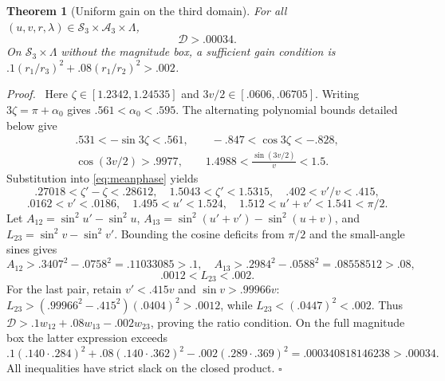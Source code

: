 \documentclass[11pt,a4paper]{article}
\numberwithin{equation}{section}
\newtheorem{theorem}{Theorem}[section]
\newenvironment{proof}[1][Proof]{\par\noindent\textit{#1.}\ \ignorespaces}
{\unskip\nobreak\hfill$\square$\par}
\begin{document}
\begin{theorem}[Uniform gain on the third domain]\label{thm:gain}
For all $(u,v,r,\lambda)\in\mathcal S_3\times\mathcal A_3\times\Lambda$,
\begin{equation}\label{eq:gainmargin}
\mathcal D>.00034.
\end{equation}
On $\mathcal S_3\times\Lambda$ without the magnitude box, a sufficient
gain condition is
$ .1(r_1/r_3)^2+.08(r_1/r_2)^2>.002$.
\end{theorem}
\begin{proof}
Here $\zeta\in[1.2342,1.24535]$ and $3v/2\in[.0606,.06705]$.
Writing $3\zeta=\pi+\alpha_0$ gives $.561<\alpha_0<.595$.
The alternating polynomial bounds detailed below give
\[
\begin{gathered}
.531<-\sin3\zeta<.561,\qquad -.847<\cos3\zeta<-.828,\\
\cos(3v/2)>.9977,\qquad
1.4988<\frac{\sin(3v/2)}v<1.5.
\end{gathered}
\]
Substitution into \eqref{eq:meanphase} yields
\[
.27018<\zeta'-\zeta<.28612,\quad
1.5043<\zeta'<1.5315,\quad .402<v'/v<.415,
\]
\[
.0162<v'<.0186,\quad 1.495<u'<1.524,\quad
1.512<u'+v'<1.541<\pi/2.
\]
Let $A_{12}=\sin^2u'-\sin^2u$, $A_{13}=\sin^2(u'+v')-\sin^2(u+v)$,
and $L_{23}=\sin^2v-\sin^2v'$. Bounding the cosine deficits from $\pi/2$
and the small-angle sines gives
\[
A_{12}>.3407^2-.0758^2=.11033085>.1,\quad
A_{13}>.2984^2-.0588^2=.08558512>.08,
\]
\[
.0012<L_{23}<.002.
\]
For the last pair, retain $v'<.415v$ and $\sin v>.99966v$:
$L_{23}>(.99966^2-.415^2)(.0404)^2>.0012$, while
$L_{23}<(.0447)^2<.002$.
Thus $\mathcal D>.1w_{12}+.08w_{13}-.002w_{23}$, proving the ratio
condition. On the full magnitude box the latter expression exceeds
\[
.1(.140\cdot.284)^2+.08(.140\cdot.362)^2
-.002(.289\cdot.369)^2
=.000340818146238>.00034 .
\]
All inequalities have strict slack on the closed product.
\end{proof}
\end{document}
